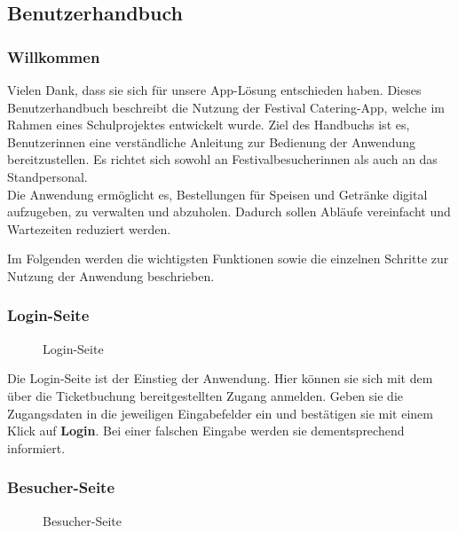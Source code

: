 \subsection{Benutzerhandbuch}
\label{app:Benutzerhandbuch}

\subsubsection{Willkommen}
\label{app:BenutzerhandbuchWillkommen}
Vielen Dank, dass sie sich für unsere App-Lösung entschieden haben. Dieses Benutzerhandbuch beschreibt die Nutzung der Festival Catering-App,
welche im Rahmen eines Schulprojektes entwickelt wurde. Ziel des Handbuchs ist es, Benutzerinnen eine verständliche Anleitung zur Bedienung der
Anwendung bereitzustellen. Es richtet sich sowohl an Festivalbesucherinnen als auch an das Standpersonal. \\
Die Anwendung ermöglicht es, Bestellungen für Speisen und Getränke digital aufzugeben, zu verwalten und abzuholen. Dadurch sollen Abläufe 
vereinfacht und Wartezeiten reduziert werden.

Im Folgenden werden die wichtigsten Funktionen sowie die einzelnen Schritte zur Nutzung der Anwendung beschrieben.

\subsubsection{Login-Seite}
\label{app:BenutzerhandbuchLoginSeite}

\begin{figure}[htb]
\centering
{}
\caption{Login-Seite}
\end{figure}

Die Login-Seite ist der Einstieg der Anwendung. Hier können sie sich mit dem über die Ticketbuchung bereitgestellten Zugang anmelden. Geben sie die 
Zugangsdaten in die jeweiligen Eingabefelder ein und bestätigen sie mit einem Klick auf \textbf{Login}. Bei einer falschen Eingabe werden sie
dementsprechend informiert.

\subsubsection{Besucher-Seite}
\label{app:BenutzerhandbuchBesucherSeite}

\begin{figure}[htb]
\centering
{}
\caption{Besucher-Seite}
\end{figure}

